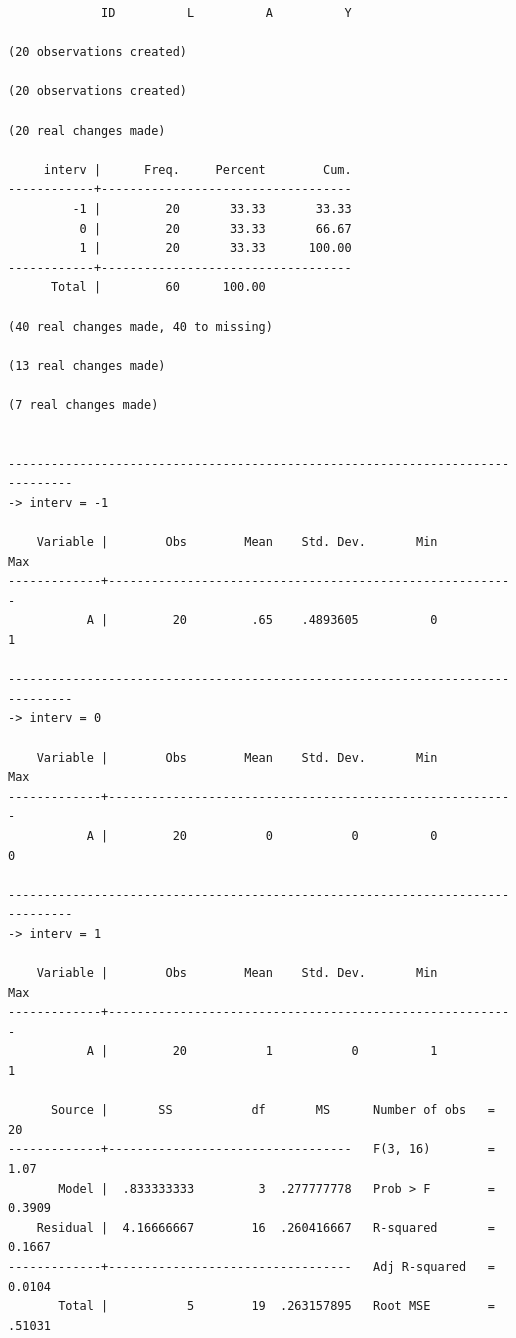 \documentclass[
  10pt,
]{book}
\begin{document}
\begin{verbatim}
             ID          L          A          Y

(20 observations created)

(20 observations created)

(20 real changes made)

     interv |      Freq.     Percent        Cum.
------------+-----------------------------------
         -1 |         20       33.33       33.33
          0 |         20       33.33       66.67
          1 |         20       33.33      100.00
------------+-----------------------------------
      Total |         60      100.00

(40 real changes made, 40 to missing)

(13 real changes made)

(7 real changes made)


-------------------------------------------------------------------------------
-> interv = -1

    Variable |        Obs        Mean    Std. Dev.       Min        Max
-------------+---------------------------------------------------------
           A |         20         .65    .4893605          0          1

-------------------------------------------------------------------------------
-> interv = 0

    Variable |        Obs        Mean    Std. Dev.       Min        Max
-------------+---------------------------------------------------------
           A |         20           0           0          0          0

-------------------------------------------------------------------------------
-> interv = 1

    Variable |        Obs        Mean    Std. Dev.       Min        Max
-------------+---------------------------------------------------------
           A |         20           1           0          1          1

      Source |       SS           df       MS      Number of obs   =        20
-------------+----------------------------------   F(3, 16)        =      1.07
       Model |  .833333333         3  .277777778   Prob > F        =    0.3909
    Residual |  4.16666667        16  .260416667   R-squared       =    0.1667
-------------+----------------------------------   Adj R-squared   =    0.0104
       Total |           5        19  .263157895   Root MSE        =    .51031


\end{verbatim}
\end{document}
